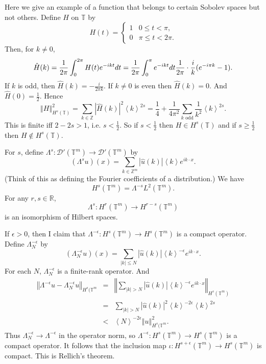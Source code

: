 \documentclass{article}
\newcommand{\jap}[1]{\left\langle #1 \right\rangle}
\newcommand{\norm}[1]{\left\Vert #1 \right\Vert}
\begin{document}
Here we give an example of a function that belongs to certain Sobolev spaces but not others. 
Define $H$ on $\mathbb{T}$ by
\[
H(t)=\begin{cases}1&0 \leq t < \pi,\\
0&\pi \leq t < 2\pi.
\end{cases}
\]
Then, for $k \neq 0$,
\[
\hat{H}(k)=\frac{1}{2\pi} \int_0^{2\pi} H(t) e^{-ikt} dt
=\frac{1}{2\pi}\int_0^\pi e^{-ikt} dt\\
\frac{1}{2\pi} \cdot \frac{i}{k}(e^{-i\pi k}-1).
\]
If $k$ is odd, then $\hat{H}(k)=-\frac{i}{2\pi k}$. If $k \neq 0$ is even then $\hat{H}(k)=0$. And
$\hat{H}(0)=\frac{1}{2}$. Hence
\[
\norm{H}_{H^s(\mathbb{T})}^2=\sum_{k \in \mathbb{Z}} |\hat{H}(k)|^2 \jap{k}^{2s}
=\frac{1}{4}+ \frac{1}{4\pi^2} \sum_{\textrm{$k$ odd}} \frac{1}{k^2} \jap{k}^{2s}.
\]
This is finite iff $2-2s>1$, i.e. $s<\frac{1}{2}$. So if $s < \frac{1}{2}$ then
$H \in H^s(\mathbb{T})$ and if $s \geq \frac{1}{2}$ then $H \not  \in H^s(\mathbb{T})$. 

For $s$, define $\Lambda^s:\mathcal{D}'(\mathbb{T}^m) \to \mathcal{D}'(\mathbb{T}^m)$ by
\[
(\Lambda^s u)(x)=\sum_{k \in \mathbb{Z}^m} |\hat{u}(k)|\jap{k}e^{ik\cdot x}.
\]
(Think of this as defining the Fourier coefficients of a distribution.)
We have 
\[
H^s(\mathbb{T}^m)=\Lambda^{-s} L^2(\mathbb{T}^m).
\]
For any $r,s \in \mathbb{R}$,
\[
\Lambda^s:H^r(\mathbb{T}^m) \to H^{r-s}(\mathbb{T}^m)
\]
is an isomorphism of Hilbert spaces. 

If $\epsilon>0$, then I claim that $\Lambda^{-\epsilon}: H^s(\mathbb{T}^m) \to H^s(\mathbb{T}^m)$ is a compact operator. 
Define $\Lambda_N^{-\epsilon}$ by
\[
(\Lambda_N^{-\epsilon} u)(x)=\sum_{|k| \leq N} |\hat{u}(k)| \jap{k}^{-\epsilon} e^{ik \cdot x}.
\]
For each $N$, $\Lambda_N^{-\epsilon}$ is a finite-rank operator. And
\begin{eqnarray*}
\norm{\Lambda^{-\epsilon} u - \Lambda_N^{-\epsilon}u}_{H^s(\mathbb{T}^m}&=&\norm{\sum_{|k|>N} |\hat{u}(k)|\jap{k}^{-\epsilon} e^{ik\cdot x}}_{H^s(\mathbb{T}^m)}\\
&=&\sum_{|k|>N} |\hat{u}(k)|^2 \jap{k}^{-2\epsilon} \jap{k}^{2s}\\
&<&\jap{N}^{-2\epsilon} \norm{u}^2_{H^s(\mathbb{T}^m}.
\end{eqnarray*}
Thus $\Lambda_N^{-\epsilon} \to \Lambda^{-\epsilon}$ in the operator norm, so $\Lambda^{-\epsilon}:H^s(\mathbb{T}^m) \to H^s(\mathbb{T}^m)$ is a compact operator.
It follows that the inclusion map $\iota:H^{s+\epsilon}(\mathbb{T}^m) \to H^s(\mathbb{T}^m)$ is compact. This is Rellich's theorem.
\end{document}

